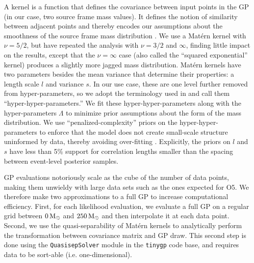 \documentclass[]{aastex631}
\begin{document}
A kernel is a function that defines the covariance between input points in the GP (in our case, two source frame mass values). 
It defines the notion of similarity between adjacent points and thereby encodes our assumptions about the smoothness of the source frame mass distribution \citep{rasmussen_gaussian_2006}.
We use a Mat\'ern kernel \citep{handcock_and_stein,stein_1999} with $\nu = 5/2$, but have repeated the analysis with $\nu=3/2$ and $\infty$, finding little impact on the results, except that the $\nu=\infty$ case (also called the ``squared exponential'' kernel) produces a slightly more jagged mass distribution.
Mat\'ern kernels have two parameters besides the mean variance that determine their properties: a length scale $l$ and variance $s$.
In our use case, these are one level further removed from hyper-parameters, so we adopt the terminology used in \citet{callister_ar} and call them ``hyper-hyper-parameters.''
We fit these hyper-hyper-parameters along with the hyper-parameters $\Lambda$ to minimize prior assumptions about the form of the mass distribution.
We use ``penalized-complexity'' priors on the hyper-hyper-parameters to enforce that the model does not create small-scale structure uninformed by data, thereby avoiding over-fitting \citep{simpson_penalising_2017,simpson_garcpas_2022}. %
Explicitly, the priors on $l$ and $s$ have less than 5\% support for correlation lengths smaller than the  spacing between event-level posterior samples.

GP evaluations notoriously scale as the cube of the number of data points, making them unwieldy with large data sets such as the ones expected for O5.
We therefore make two approximations to a full GP to increase computational efficiency.
First, for each likelihood evaluation, we evaluate a full GP on a regular grid between $0\,\text{M}_{\odot}$ and $250\,\text{M}_{\odot}$ and then interpolate it at each data point.
Second, we use the quasi-separability of Mat\'ern kernels to analytically perform the transformation between covariance matrix and GP draw.
This second step is done using the \texttt{QuasisepSolver} module \citep{foreman-mackey_fast_2017} in the \texttt{tinygp} code base, and requires data to be sort-able (i.e. one-dimensional).
\end{document}
